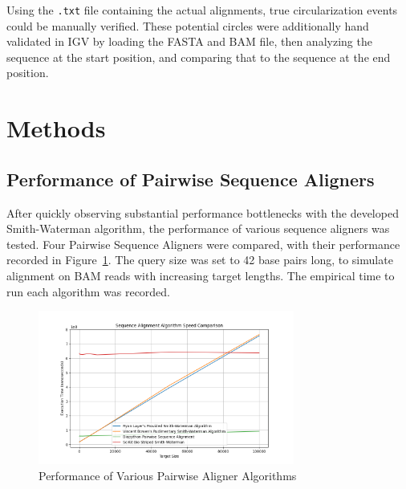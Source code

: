 \documentclass[11pt, letterpaper]{article}
\begin{document}
Using the \verb|.txt| file containing the actual alignments, true circularization events could be manually verified. These potential circles were additionally hand validated in IGV by loading the FASTA and BAM file, then analyzing the sequence at the start position, and comparing that to the sequence at the end position.

\section{Methods}
\subsection{Performance of Pairwise Sequence Aligners}
After quickly observing substantial performance bottlenecks with the developed Smith-Waterman algorithm, the performance of various sequence aligners was tested. Four Pairwise Sequence Aligners were compared, with their performance recorded in Figure~\ref{fig:pw_performance}. The query size was set to 42 base pairs long, to simulate alignment on BAM reads with increasing target lengths. The empirical time to run each algorithm was recorded.

\begin{figure}[H]
\centering
\includegraphics[width=0.75\textwidth]{imgs/pw_perf.png}
\caption{Performance of Various Pairwise Aligner Algorithms}
\label{fig:pw_performance}
\end{figure}
\end{document}
